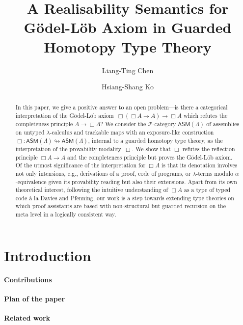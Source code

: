 \documentclass[a4paper,UKenglish,numberwithinsect,cleveref,thm-restate]{lipics-v2021}
\title{A Realisability Semantics for Gödel-Löb Axiom in Guarded Homotopy Type Theory}
\author{Liang-Ting Chen}%
  {Institute of Information Science, Academia Sinica, Taiwan~\url{https://l-tchen.github.io}}%
  {liang.ting.chen.tw@gmail.com}%
  {https://orcid.org/0000-0002-3250-1331}{}
\author{Hsiang-Shang Ko}%
  {Institute of Information Science, Academia Sinica, Taiwan~\url{https://josh-hs-ko.github.io}}%
  {joshko@iis.sinica.edu.tw}%
  {https://orcid.org/0000-0002-2439-1048}{}
\newcommand{\PP}{\mathscr{P}}
\newcommand{\ASM}{\mathsf{ASM}}
\theoremstyle{plain}
\begin{document}
\maketitle

\begin{abstract}
  In this paper, we give a positive answer to an open problem---is there a categorical interpretation of the Gödel-Löb axiom~$\Box (\Box A \to A) \to \Box A$ which refutes the completeness principle $A \to \Box A$?
  We consider the $\PP$-category $\ASM(\Lambda)$ of assemblies on untyped $\lambda$-calculus and trackable maps with an exposure-like construction $\Box\colon \ASM(\Lambda) \looparrowright \ASM(\Lambda)$, internal to a guarded homotopy type theory, as the interpretation of the provability modality~$\Box$.
  We show that $\Box$ refutes the reflection principle $\Box A \to A$ and the completeness principle but proves the Gödel-Löb axiom.
  Of the utmost significance of the interpretation for $\Box A$ is that its denotation involves not only intensions, e.g., derivations of a proof, code of programs, or $\lambda$-terms modulo $\alpha$-equivalence given its provability reading but also their extensions. 
  Apart from its own theoretical interest, following the intuitive understanding of $\Box A$ as a type of typed code \`a la Davies and Pfenning, our work is a step towards extending type theories on which proof assistants are based with non-structural but guarded recursion on the meta level in a logically consistent way.
\end{abstract}

\section{Introduction}\label{sec:intro}
\cite{Litak2014}
\cite{Davies2001b}

\paragraph*{Contributions}

\paragraph*{Plan of the paper}

\paragraph*{Related work}
\cite{Visser2019,Beklemishev2006}
\cite{Kavvos2017,Kavvos2020}
\cite{Shamkanov2014,Shamkanov2016a}
\end{document}
